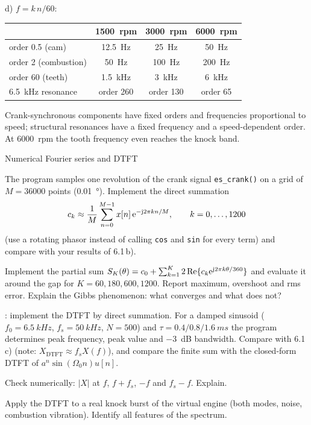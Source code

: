 \begin{solution}
d) $f=k\,n/60$:
\begin{center}\small
\begin{tabular}{@{}lccc@{}}\toprule
 & \SI{1500}{rpm} & \SI{3000}{rpm} & \SI{6000}{rpm}\\\midrule
order 0.5 (cam) & \SI{12.5}{Hz} & \SI{25}{Hz} & \SI{50}{Hz}\\
order 2 (combustion) & \SI{50}{Hz} & \SI{100}{Hz} & \SI{200}{Hz}\\
order 60 (teeth) & \SI{1.5}{kHz} & \SI{3}{kHz} & \SI{6}{kHz}\\
\SI{6.5}{kHz} resonance & order 260 & order 130 & order 65\\\bottomrule
\end{tabular}
\end{center}
Crank-synchronous components have fixed orders and frequencies proportional
to speed; structural resonances have a fixed frequency and a
speed-dependent order. At \SI{6000}{rpm} the tooth frequency even reaches the
knock band.
\end{solution}

\begin{exercise}{Numerical Fourier series and DTFT}{\JSLinux}
\begin{tasks}
  \item The program  samples
    one revolution of the crank signal \texttt{es\_crank()} on a grid of
    $M=36000$ points (\SI{0.01}{\degree}). Implement the direct summation
    \[c_k\approx\frac1M\sum_{n=0}^{M-1} x[n]\,\mathrm{e}^{-\mathrm{j}2\pi kn/M},\qquad k=0,\dots,1200\]
    (use a rotating phasor instead of calling \texttt{cos} and \texttt{sin}
    for every term) and compare with your results of 6.1\,b).
  \item Implement the partial sum
    $S_K(\theta)=c_0+\sum_{k=1}^K2\operatorname{Re}\{c_k\mathrm{e}^{\mathrm{j}2\pi k\theta/360}\}$
    and evaluate it around the gap for $K=60,180,600,1200$. Report maximum,
    overshoot and rms error. Explain the Gibbs phenomenon: what converges
    and what does not?
  \item {}: implement the DTFT by direct
    summation. For a damped sinusoid ($f_0=\SI{6.5}{kHz}$,
    $f_s=\SI{50}{kHz}$, $N=500$) and $\tau=0.4/0.8/\SI{1.6}{ms}$ the program
    determines peak frequency, peak value and \SI{-3}{dB} bandwidth. Compare
    with 6.1\,c) (note: $X_\mathrm{DTFT}\approx f_sX(f)$), and compare the
    finite sum with the closed-form DTFT of $a^n\sin(\Omega_0n)u[n]$.
  \item Check numerically: $|X|$ at $f$, $f+f_s$, $-f$ and $f_s-f$. Explain.
  \item Apply the DTFT to a real knock burst of the virtual engine
    (both modes, noise, combustion vibration). Identify all features of the
    spectrum.
\end{tasks}
\end{exercise}

